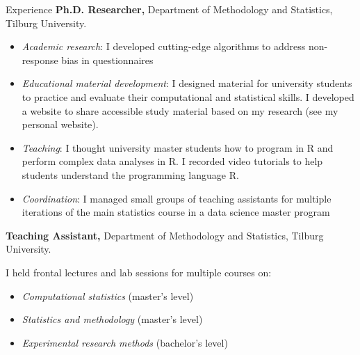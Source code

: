 %
%
\begin{rubric}{Experience}
%
	\textbf{Ph.D. Researcher,} Department of Methodology and Statistics, Tilburg University.
	\par 
		\begin{itemize}
			\item \textit{Academic research}: I developed cutting-edge algorithms to address non-response bias in questionnaires
			\item \textit{Educational material development}: I designed material for university students to practice and evaluate their computational and statistical skills. I developed a website to share accessible study material based on my research (see my personal website).
			\item \textit{Teaching}: I thought university master students how to program in R and perform complex data analyses in R. I recorded video tutorials to help students understand the programming language R.
			\item \textit{Coordination}: I managed small groups of teaching assistants for multiple iterations of the main statistics course in a data science master program
		\end{itemize}

\entry*[2018 -- 2019]%
	\textbf{Teaching Assistant,} Department of Methodology and Statistics, Tilburg University. 
	\par I held frontal lectures and lab sessions for multiple courses on:
	\begin{itemize} 
		\item \textit{Computational statistics} (master's level)
		\item \textit{Statistics and methodology} (master's level)
		\item \textit{Experimental research methods} (bachelor's level)
	\end{itemize}

%
\end{rubric}